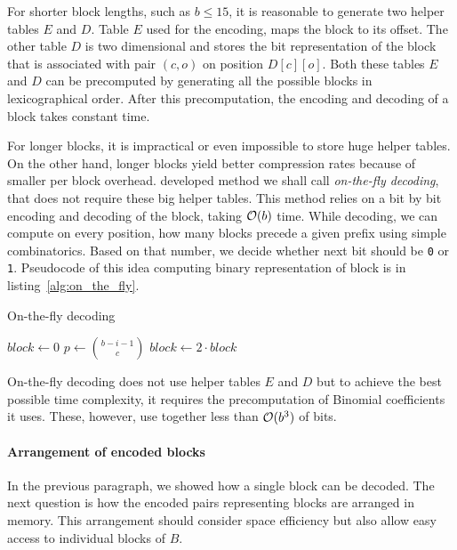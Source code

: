 For shorter block lengths, such as $b\leq 15$, it is reasonable to generate two helper tables $E$ and $D$.
Table $E$ used for the encoding, maps the block to its offset. The other table $D$ is two dimensional and
stores the bit representation of the block that is associated with pair $(c, o)$ on position $D[c][o]$.
Both these tables $E$ and $D$ can be precomputed by generating all the possible blocks in lexicographical
order. After this precomputation, the encoding and decoding of a block takes constant time.

For longer blocks, it is impractical or even impossible to store huge helper tables. On the other
hand, longer blocks yield better compression rates because of smaller per block overhead. \cite{navarro2012fast}
developed method we shall call \textit{on-the-fly decoding}, that does not require these big helper tables. 
This method relies on a bit by bit encoding and decoding of the block, taking $\mathcal{O}(b)$ time. While decoding,
we can compute on every position, how many blocks precede a given prefix using simple combinatorics. Based on
that number, we decide whether next bit should be {\tt 0} or {\tt 1}. Pseudocode of this idea computing binary
representation of block is in listing~\ref{alg:on_the_fly}.

\begin{algorithm}
\caption{On-the-fly decoding}\label{alg:on_the_fly}
    $block \gets 0$\;
     {
        $p \gets {b-i-1\choose c}$\;
         {
            $block \gets 2\cdot block$\;
        } 
    }
\end{algorithm}

On-the-fly decoding does not use helper tables $E$ and $D$ but to achieve the best possible time complexity,
it requires the precomputation of Binomial coefficients it uses. These, however, use together less than $\mathcal{O}(b^3)$
of bits.

\paragraph{Arrangement of encoded blocks}

In the previous paragraph, we showed how a single block can be decoded. The next question is how the
encoded pairs representing blocks are arranged in memory. This arrangement should consider space efficiency
but also allow easy access to individual blocks of $B$.


